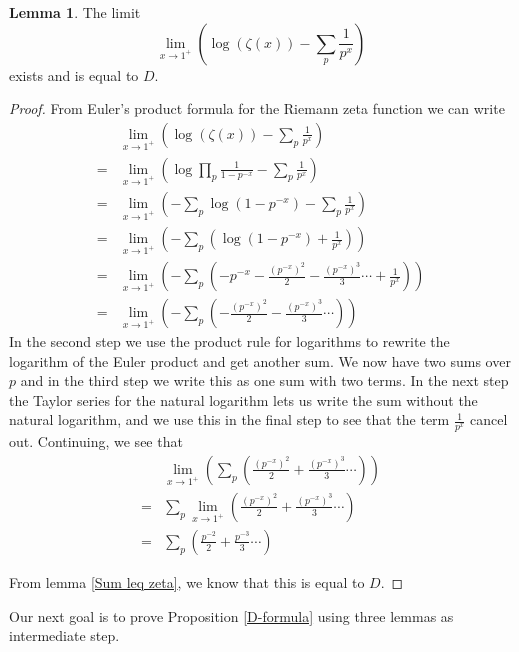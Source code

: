 \documentclass{article}
\theoremstyle{definition}
\newtheorem{lemma}[theorem]{Lemma}
\theoremstyle{remark}
\begin{document}
\begin{lemma}\label{logzeta-G}
The limit
$$\lim_{x\rightarrow 1^+}\left(\log(\zeta(x))-\sum_p\frac{1}{p^x} \right)$$
exists and is equal to $D$.
\end{lemma}
\begin{proof}
From Euler's product formula for the Riemann zeta function we can write
\begin{equation}
\begin{split}
& \lim_{x\rightarrow 1^+}\left(\log(\zeta(x))-\sum_p\frac{1}{p^x} \right) \\
 = & \lim_{x\rightarrow 1^+} \left( \log \prod_p \frac{1}{1-p^{-x}}-\sum_p\frac{1}{p^x} \right) \\
 = & \lim_{x\rightarrow 1^+} \left(-\sum_p \log(1-p^{-x})- \sum_p\frac{1}{p^x} \right)\\
 = & \lim_{x\rightarrow 1^+} \left(-\sum_p\left(\log(1-p^{-x})+\frac{1}{p^x} \right)\right) \\
 = & \lim_{x\rightarrow 1^+} \left(-\sum_p\left(-p^{-x}-\frac{(p^{-x})^2}{2}-\frac{(p^{-x})^3}{3}\cdots+\frac{1}{p^x} \right)\right) \\
 = & \lim_{x\rightarrow 1^+} \left(-\sum_p\left(-\frac{(p^{-x})^2}{2}-\frac{(p^{-x})^3}{3}\cdots \right)\right)
\end{split}
\end{equation}
In the second step we use the product rule for logarithms to rewrite the logarithm of the Euler product and get another sum. We now have two sums over $p$ and in the third step we  write this as one sum with two terms. In the next step the Taylor series for the natural logarithm lets us write the sum without the natural logarithm, and we use this in the final step to see that the term $\frac{1}{p^x}$ cancel out. Continuing, we see that
\begin{equation}
\begin{split}
& \lim_{x\rightarrow 1^+} \left(\sum_p\left(\frac{(p^{-x})^2}{2}+\frac{(p^{-x})^3}{3}\cdots \right)\right) \\
= &  \sum_p \lim_{x\rightarrow 1^+}\left(\frac{(p^{-x})^2}{2}+\frac{(p^{-x})^3}{3}\cdots \right) \\
= & \sum_p \left(\frac{p^{-2}}{2}+\frac{p^{-3}}{3}\cdots \right)
\end{split}
\end{equation}



From lemma \ref{Sum leq zeta}, we know that this is equal to $D$.
\end{proof}
Our next goal is to prove Proposition \ref{D-formula} using three lemmas as intermediate step.
\end{document}
